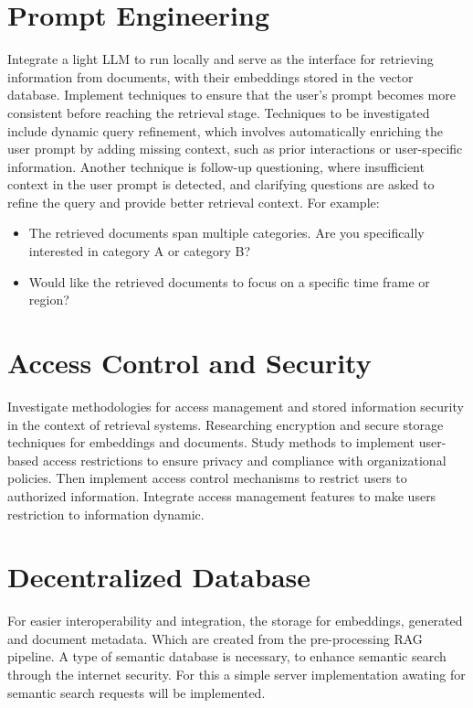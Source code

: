 \section{Prompt Engineering}
Integrate a light \ac{LLM} to run locally and serve as the interface for retrieving information from documents, with their embeddings stored in the vector database. Implement techniques to ensure that the user's prompt becomes more consistent before reaching the retrieval stage. Techniques to be investigated include dynamic query refinement, which involves automatically enriching the user prompt by adding missing context, such as prior interactions or user-specific information. Another technique is follow-up questioning, where insufficient context in the user prompt is detected, and clarifying questions are asked to refine the query and provide better retrieval context. For example:
\begin{itemize}
    \item The retrieved documents span multiple categories. Are you specifically interested in category A or category B?
    \item Would like the retrieved documents to focus on a specific time frame or region?
\end{itemize}

\section{Access Control and Security}
Investigate methodologies for access management and stored information security in the context of retrieval systems. Researching encryption and secure storage techniques for embeddings and documents. Study methods to implement user-based access restrictions to ensure privacy and compliance with organizational policies.
Then implement access control mechanisms to restrict users to authorized information. Integrate access management features to make users restriction to information dynamic.

\section{Decentralized Database}
For easier interoperability and integration, the storage for embeddings, generated and document metadata. Which are created from the pre-processing \ac{RAG} pipeline. A type of semantic database is necessary, to enhance semantic search through the internet security. For this a simple server implementation awating for semantic search requests will be implemented.

